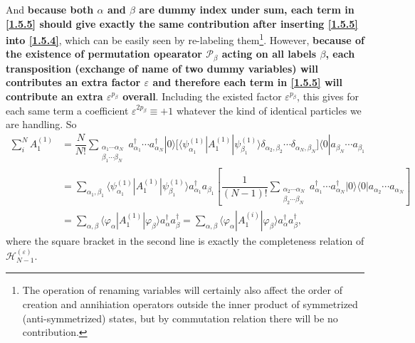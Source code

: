 \documentclass[b5paper,10pt,UTF8]{book}
\numberwithin{equation}{section}
\begin{document}
\begin{Proof}
			And \textbf{because both $\alpha$ and $\beta$ are dummy index under sum, each term in \eqref{1.5.5} should give exactly the same contribution after inserting \eqref{1.5.5} into \eqref{1.5.4}}, which can be easily seen by re-labeling them\footnote{ The operation of renaming variables will certainly also affect the order of creation and annihiation operators outside the inner product of symmetrized (anti-symmetrized) states, but by commutation relation there will be no contribution.}. However, \textbf{because of the existence of permutation opearator $\mathcal{P}_\beta$ acting on all labels $\beta$, each transposition (exchange of name of two dummy variables) will contributes an extra factor $\varepsilon$ and therefore each term in \eqref{1.5.5} will contribute an extra $\varepsilon^{p_\beta}$ overall}. Including the existed factor $\varepsilon^{p_\beta}$, this gives for each same term a coefficient $\varepsilon^{2p_\beta}\equiv+1$ whatever the kind of identical particles we are handling. So 
			\begin{align}
				\sum_i^N A_1^{(1)}&=\dfrac{N}{N!}\sum_{\substack{\alpha_1\cdots\alpha_N\\\beta_1\cdots\beta_N}}a_{\alpha_1}^\dagger\cdots a_{\alpha_N}^\dagger|0\rangle\bigg[\langle\psi_{\alpha_1}^{(1)}|A_1^{(1)}|\psi_{\beta_1}^{(1)}\rangle\delta_{\alpha_2,\beta_2}\cdots\delta_{\alpha_N,\beta_N}\bigg]\langle0|a_{\beta_N}\cdots a_{\beta_1}\nonumber\\
				&=\sum_{\alpha_1,\beta_1}\langle\psi_{\alpha_1}^{(1)}|A_1^{(1)}|\psi_{\beta_1}^{(1)}\rangle a_{\alpha_1}^\dagger a_{\beta_1}\left[\dfrac{1}{(N-1)!}\sum_{\substack{\alpha_2\cdots\alpha_N\\\beta_2\cdots\beta_N}}a_{\alpha_1}^\dagger\cdots a_{\alpha_N}^\dagger|0\rangle\langle0|a_{\alpha_2}\cdots a_{\alpha_N}\right]\nonumber\\
				&=\sum_{\alpha,\beta}\langle\varphi_\alpha|A_1^{(1)}|\varphi_\beta\rangle a_\alpha^\dagger a_\beta^\dagger=\sum_{\alpha,\beta}\langle\varphi_\alpha|A_1^{(i)}|\varphi_\beta\rangle a_\alpha^\dagger a_\beta^\dagger\nonumber,
			\end{align}
			where the square bracket in the second line is exactly the completeness relation of $\mathcal{H}_{N-1}^{(\varepsilon)}$.
		\end{Proof}
\end{document}
